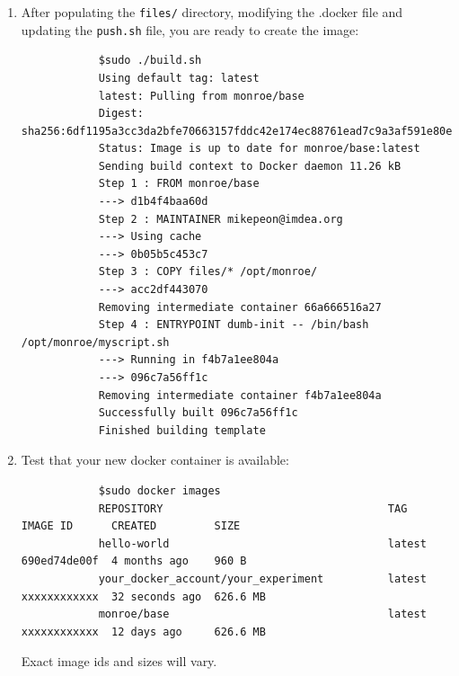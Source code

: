 \documentclass[a4paper,10pt]{article}
\newcommand{\VerbatimFont}{\footnotesize}
\newcommand{\monroe}{MONROE}
\newcommand{\identifier}[1]{{\texttt{\small{#1}}}}
\begin{document}
\begin{enumerate}
{\begin{verbatim}
			docker login && docker tag ${CONTAINER} ${CONTAINERTAG} && docker push ${CONTAINERTAG} && \
			    echo "Finished uploading ${CONTAINERTAG}"					
		\end{verbatim}}
		During the development phase of your experiment, follow these steps to make your container accessible for the testing nodes:
		\begin{itemize}
			\item Create an account at Docker Hub.
			\item Create your own repository (you can create one container as private; no limits for public ones). Containers for deployment on \monroe{} nodes must be public.
			\item In your development machine, run: \identifier{docker login}. It will ask you for your credentials.
		\end{itemize}
	\item After populating the \identifier{files/} directory, modifying the .docker file and updating the \identifier{push.sh} file, you are ready to create the image:
		{\VerbatimFont\begin{verbatim}
			$sudo ./build.sh
			Using default tag: latest
			latest: Pulling from monroe/base
			Digest: sha256:6df1195a3cc3da2bfe70663157fddc42e174ec88761ead7c9a3af591e80ebbd5
			Status: Image is up to date for monroe/base:latest
			Sending build context to Docker daemon 11.26 kB
			Step 1 : FROM monroe/base
			---> d1b4f4baa60d
			Step 2 : MAINTAINER mikepeon@imdea.org
			---> Using cache
			---> 0b05b5c453c7
			Step 3 : COPY files/* /opt/monroe/
			---> acc2df443070
			Removing intermediate container 66a666516a27
			Step 4 : ENTRYPOINT dumb-init -- /bin/bash /opt/monroe/myscript.sh
			---> Running in f4b7a1ee804a
			---> 096c7a56ff1c
			Removing intermediate container f4b7a1ee804a
			Successfully built 096c7a56ff1c
			Finished building template
		\end{verbatim}}
	\item Test that your new docker container is available:
		{\VerbatimFont\begin{verbatim}
			$sudo docker images
			REPOSITORY                                   TAG    IMAGE ID      CREATED         SIZE
			hello-world                                  latest 690ed74de00f  4 months ago    960 B
			your_docker_account/your_experiment          latest xxxxxxxxxxxx  32 seconds ago  626.6 MB
			monroe/base                                  latest xxxxxxxxxxxx  12 days ago     626.6 MB
		\end{verbatim}}
		Exact image ids and sizes will vary.

\end{enumerate}
\end{document}
